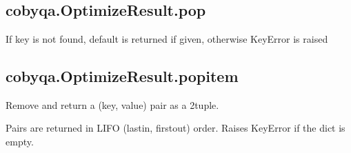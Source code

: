 \documentclass[letterpaper,10pt,english]{sphinxmanual}
\begin{document}
\begin{fulllineitems}
\begin{fulllineitems}
\label{\detokenize{refs/generated/cobyqa.OptimizeResult.keys:cobyqa.OptimizeResult.keys}}~
\end{fulllineitems}



\subsection{cobyqa.OptimizeResult.pop}
\label{\detokenize{refs/generated/cobyqa.OptimizeResult.pop:cobyqa-optimizeresult-pop}}\label{\detokenize{refs/generated/cobyqa.OptimizeResult.pop::doc}}

\begin{fulllineitems}
\label{\detokenize{refs/generated/cobyqa.OptimizeResult.pop:cobyqa.OptimizeResult.pop}}
\sphinxAtStartPar
If key is not found, default is returned if given, otherwise KeyError is raised

\end{fulllineitems}



\subsection{cobyqa.OptimizeResult.popitem}
\label{\detokenize{refs/generated/cobyqa.OptimizeResult.popitem:cobyqa-optimizeresult-popitem}}\label{\detokenize{refs/generated/cobyqa.OptimizeResult.popitem::doc}}

\begin{fulllineitems}
\label{\detokenize{refs/generated/cobyqa.OptimizeResult.popitem:cobyqa.OptimizeResult.popitem}}
\sphinxAtStartPar
Remove and return a (key, value) pair as a 2\sphinxhyphen{}tuple.

\sphinxAtStartPar
Pairs are returned in LIFO (last\sphinxhyphen{}in, first\sphinxhyphen{}out) order.
Raises KeyError if the dict is empty.


\end{fulllineitems}
\end{fulllineitems}
\end{document}
